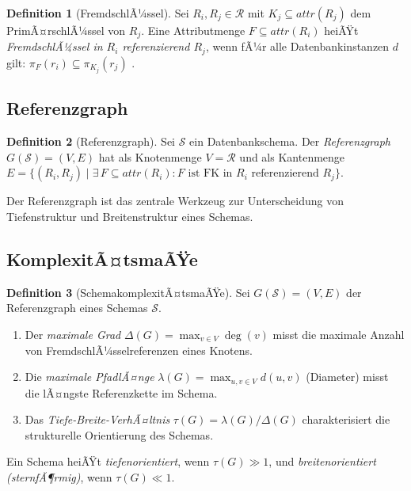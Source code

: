 ﻿\documentclass[a4paper,12pt]{report}
\theoremstyle{definition}
\newtheorem{definition}{Definition}[chapter]
\theoremstyle{remark}
\newcommand{\att}{\mathit{attr}}
\begin{document}
\begin{definition}[FremdschlÃ¼ssel]
Sei $R_i, R_j \in \mathcal{R}$ mit $K_j \subseteq \att(R_j)$ dem PrimÃ¤rschlÃ¼ssel
von $R_j$. Eine Attributmenge $F \subseteq \att(R_i)$ heiÃŸt
\emph{FremdschlÃ¼ssel in $R_i$ referenzierend $R_j$}, wenn fÃ¼r alle Datenbankinstanzen
$d$ gilt: $\pi_F(r_i) \subseteq \pi_{K_j}(r_j)$ \cite{Date2003}.
\end{definition}

\subsection{Referenzgraph}

\begin{definition}[Referenzgraph]
\label{def:refgraph}
Sei $\mathcal{S}$ ein Datenbankschema. Der \emph{Referenzgraph}
$G(\mathcal{S}) = (V, E)$ hat als Knotenmenge $V = \mathcal{R}$ und als
Kantenmenge $E = \{(R_i, R_j) \mid \exists\, F \subseteq \att(R_i)\colon
F \text{ ist FK in } R_i \text{ referenzierend } R_j\}$.
\end{definition}

Der Referenzgraph ist das zentrale Werkzeug zur Unterscheidung von
Tiefenstruktur und Breitenstruktur eines Schemas.

\subsection{KomplexitÃ¤tsmaÃŸe}

\begin{definition}[SchemakomplexitÃ¤tsmaÃŸe]
\label{def:masse}
Sei $G(\mathcal{S}) = (V, E)$ der Referenzgraph eines Schemas $\mathcal{S}$.
\begin{enumerate}[label=(\roman*)]
  \item Der \emph{maximale Grad} $\Delta(G) = \max_{v \in V} \deg(v)$ misst
        die maximale Anzahl von FremdschlÃ¼sselreferenzen eines Knotens.
  \item Die \emph{maximale PfadlÃ¤nge} $\lambda(G) = \max_{u,v \in V} d(u,v)$
        (Diameter) misst die lÃ¤ngste Referenzkette im Schema.
  \item Das \emph{Tiefe-Breite-VerhÃ¤ltnis} $\tau(G) = \lambda(G) / \Delta(G)$
        charakterisiert die strukturelle Orientierung des Schemas.
\end{enumerate}
\end{definition}

Ein Schema heiÃŸt \emph{tiefenorientiert}, wenn $\tau(G) \gg 1$, und
\emph{breitenorientiert (sternfÃ¶rmig)}, wenn $\tau(G) \ll 1$.
\end{document}
